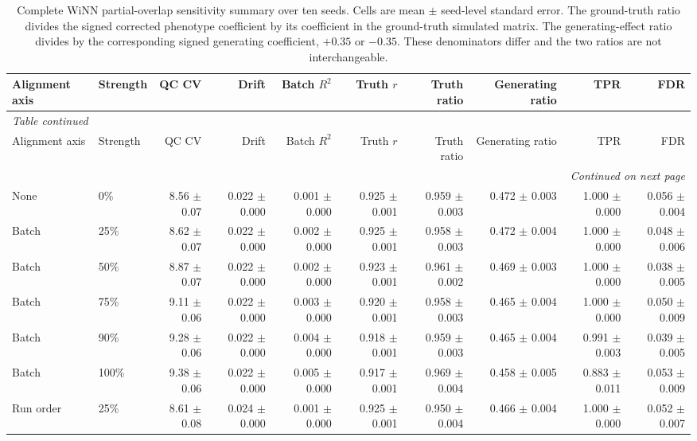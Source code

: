 \begin{landscape}
\tiny
\begin{longtable}{llrrrrrrrr}
\caption{Complete WiNN partial-overlap sensitivity summary over ten seeds. Cells are mean $\pm$ seed-level standard error. The ground-truth ratio divides the signed corrected phenotype coefficient by its coefficient in the ground-truth simulated matrix. The generating-effect ratio divides by the corresponding signed generating coefficient, $+0.35$ or $-0.35$. These denominators differ and the two ratios are not interchangeable.}\label{tab:supp_partial_confounding}\\
\toprule
Alignment axis & Strength & QC CV & Drift & Batch $R^2$ & Truth $r$ & Truth ratio & Generating ratio & TPR & FDR \\
\midrule
\endfirsthead
\multicolumn{10}{l}{\textit{Table \thetable{} continued}}\\
\toprule
Alignment axis & Strength & QC CV & Drift & Batch $R^2$ & Truth $r$ & Truth ratio & Generating ratio & TPR & FDR \\
\midrule
\endhead
\midrule
\multicolumn{10}{r}{\textit{Continued on next page}}\\
\endfoot
\bottomrule
\endlastfoot
None & 0\% & 8.56 $\pm$ 0.07 & 0.022 $\pm$ 0.000 & 0.001 $\pm$ 0.000 & 0.925 $\pm$ 0.001 & 0.959 $\pm$ 0.003 & 0.472 $\pm$ 0.003 & 1.000 $\pm$ 0.000 & 0.056 $\pm$ 0.004 \\
Batch & 25\% & 8.62 $\pm$ 0.07 & 0.022 $\pm$ 0.000 & 0.002 $\pm$ 0.000 & 0.925 $\pm$ 0.001 & 0.958 $\pm$ 0.003 & 0.472 $\pm$ 0.004 & 1.000 $\pm$ 0.000 & 0.048 $\pm$ 0.006 \\
Batch & 50\% & 8.87 $\pm$ 0.07 & 0.022 $\pm$ 0.000 & 0.002 $\pm$ 0.000 & 0.923 $\pm$ 0.001 & 0.961 $\pm$ 0.002 & 0.469 $\pm$ 0.003 & 1.000 $\pm$ 0.000 & 0.038 $\pm$ 0.005 \\
Batch & 75\% & 9.11 $\pm$ 0.06 & 0.022 $\pm$ 0.000 & 0.003 $\pm$ 0.000 & 0.920 $\pm$ 0.001 & 0.958 $\pm$ 0.003 & 0.465 $\pm$ 0.004 & 1.000 $\pm$ 0.000 & 0.050 $\pm$ 0.009 \\
Batch & 90\% & 9.28 $\pm$ 0.06 & 0.022 $\pm$ 0.000 & 0.004 $\pm$ 0.000 & 0.918 $\pm$ 0.001 & 0.959 $\pm$ 0.003 & 0.465 $\pm$ 0.004 & 0.991 $\pm$ 0.003 & 0.039 $\pm$ 0.005 \\
Batch & 100\% & 9.38 $\pm$ 0.06 & 0.022 $\pm$ 0.000 & 0.005 $\pm$ 0.000 & 0.917 $\pm$ 0.001 & 0.969 $\pm$ 0.004 & 0.458 $\pm$ 0.005 & 0.883 $\pm$ 0.011 & 0.053 $\pm$ 0.009 \\
Run order & 25\% & 8.61 $\pm$ 0.08 & 0.024 $\pm$ 0.000 & 0.001 $\pm$ 0.000 & 0.925 $\pm$ 0.001 & 0.950 $\pm$ 0.004 & 0.466 $\pm$ 0.004 & 1.000 $\pm$ 0.000 & 0.052 $\pm$ 0.007 \\

\end{longtable}
\end{landscape}
